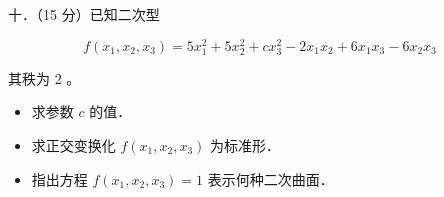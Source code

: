 \documentclass{article}
\begin{document}
十．（15 分）已知二次型

\[
f\left(x_{1}, x_{2}, x_{3}\right)=5 x_{1}^{2}+5 x_{2}^{2}+c x_{3}^{2}-2 x_{1} x_{2}+6 x_{1} x_{3}-6 x_{2} x_{3}
\]

其秩为 2 。

\begin{itemize}

  \item[1．] 求参数 \(c\) 的值．

  \item[2．] 求正交变换化 \(f\left(x_{1}, x_{2}, x_{3}\right)\) 为标准形．

  \item[3．] 指出方程 \(f\left(x_{1}, x_{2}, x_{3}\right)=1\) 表示何种二次曲面．
\end{itemize}
\end{document}
